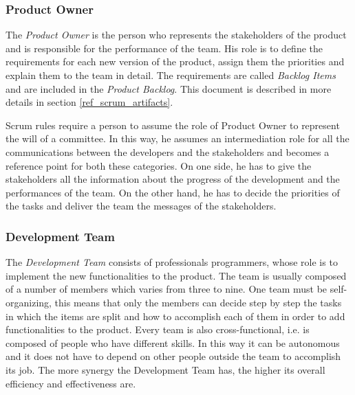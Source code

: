 			\subsubsection{Product Owner}\label{ref_prod_owner}
			The \emph{Product Owner} is the person who represents the stakeholders of the product and is responsible for the performance of the team. His role is to define the requirements for each new version of the product, assign them the priorities and explain them to the team in detail. 
			The requirements are called \emph{Backlog Items} and are included in the \emph{Product Backlog}. This document is described in more details in section \ref{ref_scrum_artifacts}.
			
			Scrum rules require a person to assume the role of Product Owner to represent the will of a committee. 
			In this way, he assumes an intermediation role for all the communications between the developers and the stakeholders and becomes a reference point for both these categories. 
			On one side, he has to give the stakeholders all the information about the progress of the development and the performances of the team. On the other hand, he has to decide the priorities of the tasks and deliver the team the messages of the stakeholders.
			

			\subsubsection{Development Team}\label{ref_scrum_dev_team}
			The \emph{Development Team} consists of professionals programmers, whose role is to implement the new functionalities to the product. The team is usually composed of a number of members which varies from three to nine. 	
			One team must be self-organizing, this means that only the members can decide step by step the tasks in which the items are split and how to accomplish each of them in order to add functionalities to the product. 
			Every team is also cross-functional, i.e. is composed of people who have different skills. In this way it can be autonomous and it does not have to depend on other people outside the team to accomplish its job.
			The more synergy the Development Team has, the higher its overall efficiency and effectiveness are.
 
